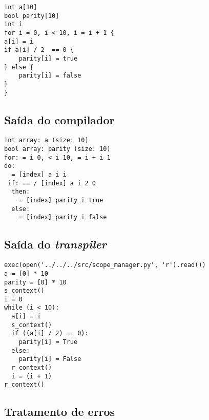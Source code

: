 \documentclass{article}
\begin{document}
\begin{verbatim}
int a[10]
bool parity[10]
int i
for i = 0, i < 10, i = i + 1 {
a[i] = i
if a[i] / 2  == 0 {
    parity[i] = true
} else {
    parity[i] = false
}
}
\end{verbatim}

\subsection{Saída do compilador}

\begin{verbatim}
int array: a (size: 10)
bool array: parity (size: 10)
for: = i 0, < i 10, = i + i 1
do:
  = [index] a i i
 if: == / [index] a i 2 0
  then:
    = [index] parity i true
  else:
    = [index] parity i false
\end{verbatim}

\subsection{Saída do \emph{transpiler}}

\begin{verbatim}
exec(open('../../../src/scope_manager.py', 'r').read())
a = [0] * 10
parity = [0] * 10
s_context()
i = 0
while (i < 10):
  a[i] = i
  s_context()
  if ((a[i] / 2) == 0):
    parity[i] = True
  else:
    parity[i] = False
  r_context()
  i = (i + 1)
r_context()
\end{verbatim}

\subsection{Tratamento de erros}
\end{document}
